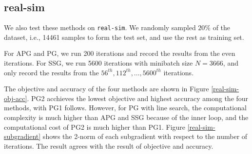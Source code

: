 \documentclass{article}
\numberwithin{equation}{section}
\numberwithin{figure}{section}
\begin{document}






\subsection{real-sim}

We also test these methods on \texttt{real-sim}. We randomly sampled $20\%$ of the dataset, i.e., 14461 samples to form the test set, and use the rest as training set. 

For APG and PG, we run 200 iterations and record the results from the even iterations. For SSG, we run 5600 iterations with minibatch size $N = 3666$, and only record the results from the $56^{th}, 112^{th}, \hdots, 5600^{th} $ iterations.

The objective and accuracy of the four methods are shown in Figure \ref{real-sim-obj-acc}. PG2 acchieves the lowest objective and highest accuracy among the four methods, with PG1 follows. However, for PG with line search, the computational complexity is much higher than APG and SSG because of the inner loop, and the computational cost of PG2 is much higher than PG1. Figure \ref{real-sim-subgradient} shows the 2-norm of each subgradient with respect to the number of iterations. The result agrees with the result of objective and accuracy.
\end{document}
